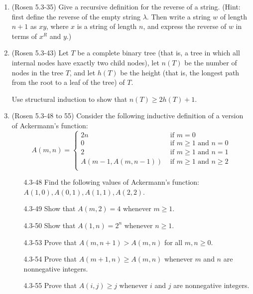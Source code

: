 \begin{enumerate}
\begin{enumerate}
\end{enumerate}

\item \strhard (Rosen 5.3-35) Give a recursive definition for the reverse of 
a string. 
(Hint: first define the reverse of the empty string $\lambda$. 
Then write a string $w$ of length $n+1$ as $xy$, where $x$ 
is a string of length $n$, and express the reverse of $w$ in terms 
of $x^R$ and $y$.)

\item \strhard (Rosen 5.3-43) Let $T$ be a complete binary tree 
(that is, a tree in which all internal nodes have exactly two 
child nodes), let $n(T)$ be the number of nodes in the tree $T$, and let $h(T)$ 
be the height (that is, the longest path from the root to a leaf of the tree) 
of $T$.

Use structural induction to show that $n(T) \geq 2 h(T)+1$.

\item  (Rosen 5.3-48 to 55) Consider the following inductive definition of a version of Ackermann's function:
\[
A(m,n)=
\left\{
\begin{array}{ll}
2n & \mbox{ if } m=0\\
0 & \mbox{ if } m\geq 1 \mbox{ and } n=0\\
2 & \mbox{ if } m\geq 1 \mbox{ and } n=1\\
A(m-1,A(m,n-1)) & \mbox{ if } m\geq 1 \mbox{ and } n\geq 2\\
\end{array}
\right.
\]
\begin{enumerate}
\item[4.3-48] \streasy Find the following values of Ackermann's function: $A(1,0),A(0,1),A(1,1),A(2,2)$.
\item[4.3-49] \streasy Show that $A(m, 2) = 4$ whenever $m \geq 1$.

\item[4.3-50] \streasy Show that $A(1, n) = 2^n$ whenever $n \geq 1$.

\item[4.3-53] \strhard Prove that $A(m,n+1) > A(m,n)$ for all $m,n\ge 0$. 

\item[4.3-54]  \strmedium Prove that $A(m + 1, n) \geq A(m, n)$ whenever $m$ and $n$ are nonnegative integers.

\item[4.3-55] \strmedium Prove that $A(i, j ) \geq j$ whenever $i$ and $j$ are nonnegative
integers.
\end{enumerate}


\end{enumerate}
